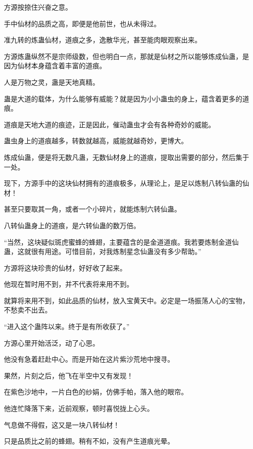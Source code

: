 
\begin{this_body}



方源按捺住兴奋之意。

手中仙材的品质之高，即便是他前世，也从未得过。

准九转的炼蛊仙材，道痕之多，逸散华光，甚至能肉眼观察出来。

方源炼蛊纵然不是宗师级数，但也明白一点，那就是仙材之所以能够炼成仙蛊，是因为仙材本身蕴含着丰富的道痕。

人是万物之灵，蛊是天地真精。

蛊是大道的载体，为什么能够有威能？就是因为小小蛊虫的身上，蕴含着更多的道痕。

道痕是天地大道的痕迹，正是因此，催动蛊虫才会有各种奇妙的威能。

蛊虫身上的道痕越多，转数就越高，威能就越奇妙，更博大。

炼成仙蛊，便是将无数凡蛊，无数仙材身上的道痕，提取出需要的部分，然后集于一处。

现下，方源手中的这块仙材拥有的道痕极多，从理论上，是足以炼制八转仙蛊的仙材！

甚至只要取其一角，或者一个小碎片，就能炼制六转仙蛊。

八转仙蛊身上的道痕，是六转仙蛊的数万倍。

“当然，这块疑似斑虎蜜蜂的蜂翅，主要蕴含的是金道道痕。我若要炼制金道仙蛊，这就很有用途。可惜目前，对我炼制星念仙蛊没有多少帮助。”

方源将这块珍贵的仙材，好好收了起来。

他现在暂时用不到，并不代表将来用不到。

就算将来用不到，如此品质的仙材，放入宝黄天中。必定是一场振荡人心的宝物，不愁卖不出去。

“进入这个蛊阵以来。终于是有所收获了。”

方源心里开始活泛，动了心思。

他没有急着赶赴中心。而是开始在这片紫沙荒地中搜寻。

果然，片刻之后，他飞在半空中又有发现！

在紫色沙地中，一片白色的纱娟，仿佛手帕，落入他的眼帘。

他连忙降落下来，近前观察，顿时喜悦拢上心头。

气息做不得假，这又是一块八转仙材！

只是品质比之前的蜂翅。稍有不如，没有产生道痕光晕。


\end{this_body}
